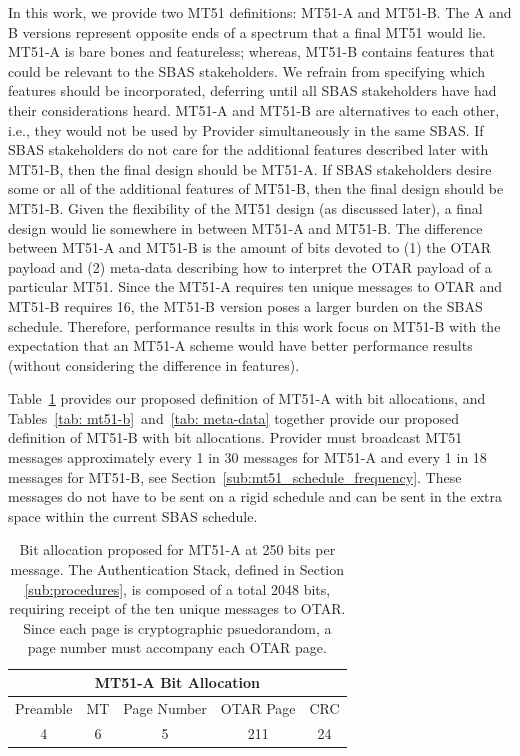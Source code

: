 \documentclass[letterpaper,times]{IONconf/IONconf}
\begin{document}
		In this work, we provide two MT51 definitions: MT51-A and MT51-B.
		The A and B versions represent opposite ends of a spectrum that a final MT51 would lie.
		MT51-A is bare bones and featureless; whereas, MT51-B contains features that could be relevant to the SBAS stakeholders.
		We refrain from specifying which features should be incorporated, deferring until all SBAS stakeholders have had their considerations heard.
		MT51-A and MT51-B are alternatives to each other, i.e., they would not be used by Provider simultaneously in the same SBAS.
		If SBAS stakeholders do not care for the additional features described later with MT51-B, then the final design should be MT51-A.
		If SBAS stakeholders desire some or all of the additional features of MT51-B, then the final design should be MT51-B.
		Given the flexibility of the MT51 design (as discussed later), a final design would lie somewhere in between MT51-A and MT51-B.
		The difference between MT51-A and MT51-B is the amount of bits devoted to (1) the OTAR payload and (2) meta-data describing how to interpret the OTAR payload of a particular MT51.
		Since the MT51-A requires ten unique messages to OTAR and MT51-B requires 16, the MT51-B version poses a larger burden on the SBAS schedule.
		Therefore, performance results in this work focus on MT51-B with the expectation that an MT51-A scheme would have better performance results (without considering the difference in features).

		Table~\ref{tab: mt51-a} provides our proposed definition of MT51-A with bit allocations, and Tables~\ref{tab: mt51-b}~and~\ref{tab: meta-data} together provide our proposed definition of MT51-B with bit allocations.
		Provider must broadcast MT51 messages approximately every 1 in 30 messages for MT51-A and every 1 in 18 messages for MT51-B, see Section~\ref{sub:mt51_schedule_frequency}.
		These messages do not have to be sent on a rigid schedule and can be sent in the extra space within the current SBAS schedule.

		\begin{table}%
				\center
				\begin{tabular}{|c|c|c|c|c|} \hline
				\multicolumn{5}{|c|}{MT51-A Bit Allocation} \\ \hline
					Preamble & MT & Page Number & OTAR Page & CRC \\ \hline
					4 & 6 & 5 & 211 & 24 \\ \hline
				\end{tabular}
				\caption{
					Bit allocation proposed for MT51-A at 250 bits per message. 
					The Authentication Stack, defined in Section \ref{sub:procedures}, is composed of a total 2048 bits, requiring receipt of the ten unique messages to OTAR.
					Since each page is cryptographic psuedorandom, a page number must accompany each OTAR page.
				}
				\label{tab: mt51-a}
			\end{table}
\end{document}

